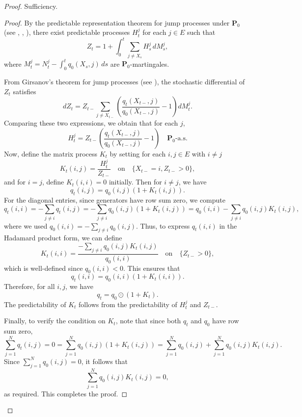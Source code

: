 \documentclass{lms}
\begin{document}
\begin{proof} {Sufficiency.}
\begin{proof}
    By the predictable representation theorem for jump processes under \(\mathbf{P}_0\) (see \cite{Boel1975}, \cite{davis1976representation}, \cite{elliott1976stochastic}), there exist predictable processes \(H_t^j\) for each \(j \in E\) such that
\[
Z_t = 1 + \int_0^t \sum_{j \neq X_s} H_s^j \, dM_s^j,
\]
where \(M_t^j = N_t^j - \int_0^t q_0(X_s, j) \, ds\) are \(\mathbf{P}_0\)-martingales.

From Girsanov's theorem for jump processes (see \cite{Sokol03092015}), the stochastic differential of \(Z_t\) satisfies
\[
dZ_t = Z_{t-} \sum_{j \neq X_{t-}} \left( \frac{q_t(X_{t-}, j)}{q_0(X_{t-}, j)} - 1 \right) dM_t^j.
\]
Comparing these two expressions, we obtain that for each \(j\),
\[
H_t^j = Z_{t-} \left( \frac{q_t(X_{t-}, j)}{q_0(X_{t-}, j)} - 1 \right) \quad \mathbf{P}_0\text{-a.s.}
\]
Now, define the matrix process \(K_t\) by setting for each \(i, j \in E\) with \(i \neq j\)
\[
K_t(i,j) = \frac{H_t^j}{Z_{t-}} \quad \text{on} \quad \{X_{t-} = i, Z_{t-} > 0\},
\]
and for \(i = j\), define \(K_t(i,i) = 0\) initially. Then for \(i \neq j\), we have
\[
q_t(i,j) = q_0(i,j) \left(1 + K_t(i,j)\right).
\]
For the diagonal entries, since generators have row sum zero, we compute
\[
q_t(i,i) = -\sum_{j \neq i} q_t(i,j) = -\sum_{j \neq i} q_0(i,j) (1 + K_t(i,j)) = q_0(i,i) - \sum_{j \neq i} q_0(i,j) K_t(i,j),
\]
where we used \(q_0(i,i) = -\sum_{j \neq i} q_0(i,j)\). Thus, to express \(q_t(i,i)\) in the Hadamard product form, we can define
\[
K_t(i,i) = \frac{ -\sum_{j \neq i} q_0(i,j) K_t(i,j) }{q_0(i,i) } \quad \text{on} \quad \{Z_{t-} > 0\},
\]
which is well-defined since \(q_0(i,i) < 0\). This ensures that
\[
q_t(i,i) = q_0(i,i) (1 + K_t(i,i)).
\]
Therefore, for all \(i, j\), we have
\[
q_t = q_0 \odot (1 + K_t).
\]
The predictability of \(K_t\) follows from the predictability of \(H_t^j\) and \(Z_{t-}\).

Finally, to verify the condition on \(K_t\), note that since both \(q_t\) and \(q_0\) have row sum zero,
\[
\sum_{j=1}^N q_t(i,j) = 0 = \sum_{j=1}^N q_0(i,j) (1 + K_t(i,j)) = \sum_{j=1}^N q_0(i,j) + \sum_{j=1}^N q_0(i,j) K_t(i,j).
\]
Since \(\sum_{j=1}^N q_0(i,j) = 0\), it follows that
\[
\sum_{j=1}^N q_0(i,j) K_t(i,j) = 0,
\]
as required. This completes the proof.
\end{proof}

 


\end{proof}
\end{document}
